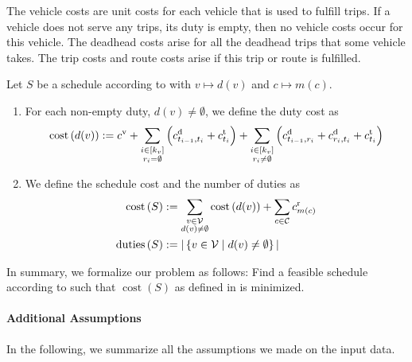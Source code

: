 The vehicle costs are unit costs for each vehicle that is used to fulfill trips. If a vehicle does not serve any trips, \ie its duty is empty, then no vehicle costs occur for this vehicle. The deadhead costs arise for all the deadhead trips that some vehicle takes. The trip costs and route costs arise if this trip or route is fulfilled.

\begin{definition}
\label{def:schedule_cost}

Let $S$ be a schedule according to  with ${v\mapsto d(v)}$ and ${c\mapsto m(c)}$.
\begin{enumerate}
	\item
For each non-empty duty, \ie $d(v)\neq\emptyset$, we define the duty cost as
\begin{align*}
	\operatorname{cost}\left(d(v)\right) := c^{\operatorname{v}} + \sum_{\substack{i\in[k_v] \\ r_i=\emptyset}} \left(c^{\operatorname{d}}_{t_{i-1},t_i} + c^{\operatorname{t}}_{t_i}\right) + \sum_{\substack{i\in[k_v] \\ r_i\neq\emptyset}} \left(c^{\operatorname{d}}_{t_{i-1},r_i} + c^{\operatorname{d}}_{r_i,t_i} + c^{\operatorname{t}}_{t_i}\right)
\end{align*}

	\item
We define the schedule cost and the number of duties as
\begin{align*}
	\operatorname{cost}\left(S\right) & := \sum_{\substack{v\in\mathcal{V} \\ d(v)\neq\emptyset}} \operatorname{cost}\left(d(v)\right) + \sum_{c\in\mathcal{C}} c^{\operatorname{r}}_{m(c)} \\
	\operatorname{duties}\left(S\right) & := |\left\{v\in\mathcal{V}\mid d(v)\neq\emptyset\right\}|
\end{align*}
\end{enumerate}

\end{definition}

In summary, we formalize our problem as follows: Find a feasible schedule according to  such that $\operatorname{cost}\left(S\right)$ as defined in  is minimized.

\paragraph{Additional Assumptions} \parfill

In the following, we summarize all the assumptions we made on the input data.

